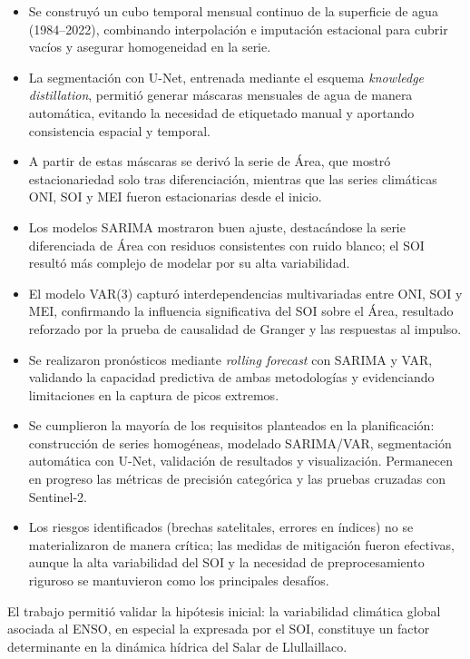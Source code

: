 \begin{itemize}
    \item Se construyó un cubo temporal mensual continuo de la superficie de agua (1984--2022), combinando interpolación e imputación estacional para cubrir vacíos y asegurar homogeneidad en la serie.
    \item La segmentación con U-Net, entrenada mediante el esquema \emph{knowledge distillation}, permitió generar máscaras mensuales de agua de manera automática, evitando la necesidad de etiquetado manual y aportando consistencia espacial y temporal.
    \item A partir de estas máscaras se derivó la serie de Área, que mostró estacionariedad solo tras diferenciación, mientras que las series climáticas ONI, SOI y MEI fueron estacionarias desde el inicio.
    \item Los modelos SARIMA mostraron buen ajuste, destacándose la serie diferenciada de Área con residuos consistentes con ruido blanco; el SOI resultó más complejo de modelar por su alta variabilidad.
    \item El modelo VAR(3) capturó interdependencias multivariadas entre ONI, SOI y MEI, confirmando la influencia significativa del SOI sobre el Área, resultado reforzado por la prueba de causalidad de Granger y las respuestas al impulso.
    \item Se realizaron pronósticos mediante \emph{rolling forecast} con SARIMA y VAR, validando la capacidad predictiva de ambas metodologías y evidenciando limitaciones en la captura de picos extremos.
    \item Se cumplieron la mayoría de los requisitos planteados en la planificación: construcción de series homogéneas, modelado SARIMA/VAR, segmentación automática con U-Net, validación de resultados y visualización. Permanecen en progreso las métricas de precisión categórica y las pruebas cruzadas con Sentinel-2.
    \item Los riesgos identificados (brechas satelitales, errores en índices) no se materializaron de manera crítica; las medidas de mitigación fueron efectivas, aunque la alta variabilidad del SOI y la necesidad de preprocesamiento riguroso se mantuvieron como los principales desafíos.
\end{itemize}


El trabajo permitió validar la hipótesis inicial: la variabilidad climática global asociada al ENSO, en especial la expresada por el SOI, constituye un factor determinante en la dinámica hídrica del Salar de Llullaillaco.

